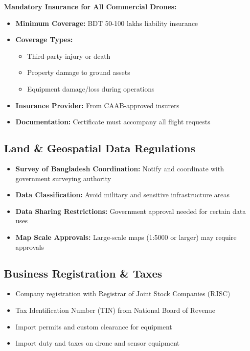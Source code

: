 \textbf{Mandatory Insurance for All Commercial Drones:}
\begin{itemize}
    \item \textbf{Minimum Coverage:} BDT 50-100 lakhs liability insurance
    \item \textbf{Coverage Types:}
    \begin{itemize}
        \item Third-party injury or death
        \item Property damage to ground assets
        \item Equipment damage/loss during operations
    \end{itemize}
    \item \textbf{Insurance Provider:} From CAAB-approved insurers
    \item \textbf{Documentation:} Certificate must accompany all flight requests
\end{itemize}

\subsection{Land \& Geospatial Data Regulations}

\begin{itemize}
    \item \textbf{Survey of Bangladesh Coordination:} Notify and coordinate with government surveying authority
    \item \textbf{Data Classification:} Avoid military and sensitive infrastructure areas
    \item \textbf{Data Sharing Restrictions:} Government approval needed for certain data uses
    \item \textbf{Map Scale Approvals:} Large-scale maps (1:5000 or larger) may require approvals
\end{itemize}

\subsection{Business Registration \& Taxes}

\begin{itemize}
    \item Company registration with Registrar of Joint Stock Companies (RJSC)
    \item Tax Identification Number (TIN) from National Board of Revenue
    \item Import permits and custom clearance for equipment
    \item Import duty and taxes on drone and sensor equipment
\end{itemize}

